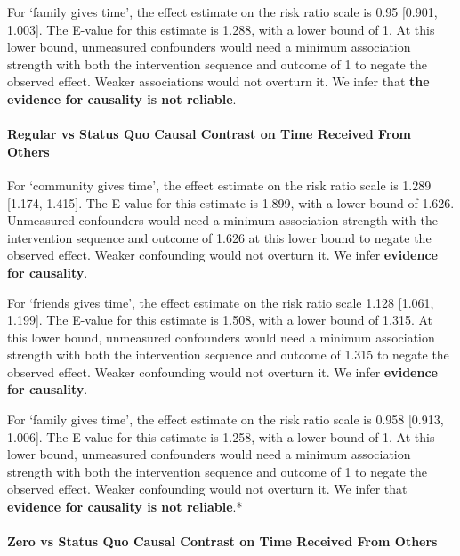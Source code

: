 \documentclass[
  single column]{article}
\let\oldparagraph\paragraph
\renewcommand{\paragraph}[1]{\oldparagraph{#1}\mbox{}}
\begin{document}
For `family gives time', the effect estimate on the risk ratio scale is
0.95 {[}0.901, 1.003{]}. The E-value for this estimate is 1.288, with a
lower bound of 1. At this lower bound, unmeasured confounders would need
a minimum association strength with both the intervention sequence and
outcome of 1 to negate the observed effect. Weaker associations would
not overturn it. We infer that \textbf{the evidence for causality is not
reliable}.

\newpage{}

\paragraph{Regular vs Status Quo Causal Contrast on Time Received From
Others}\label{regular-vs-status-quo-causal-contrast-on-time-received-from-others}

For `community gives time', the effect estimate on the risk ratio scale
is 1.289 {[}1.174, 1.415{]}. The E-value for this estimate is 1.899,
with a lower bound of 1.626. Unmeasured confounders would need a minimum
association strength with the intervention sequence and outcome of 1.626
at this lower bound to negate the observed effect. Weaker confounding
would not overturn it. We infer \textbf{evidence for causality}.

For `friends gives time', the effect estimate on the risk ratio scale
1.128 {[}1.061, 1.199{]}. The E-value for this estimate is 1.508, with a
lower bound of 1.315. At this lower bound, unmeasured confounders would
need a minimum association strength with both the intervention sequence
and outcome of 1.315 to negate the observed effect. Weaker confounding
would not overturn it. We infer \textbf{evidence for causality}.

For `family gives time', the effect estimate on the risk ratio scale is
0.958 {[}0.913, 1.006{]}. The E-value for this estimate is 1.258, with a
lower bound of 1. At this lower bound, unmeasured confounders would need
a minimum association strength with both the intervention sequence and
outcome of 1 to negate the observed effect. Weaker confounding would not
overturn it. We infer that \textbf{evidence for causality is not
reliable}.*

\newpage{}

\paragraph{Zero vs Status Quo Causal Contrast on Time Received From
Others}\label{zero-vs-status-quo-causal-contrast-on-time-received-from-others}
\end{document}

